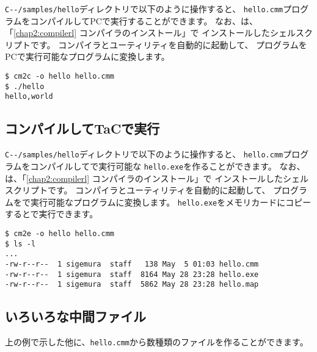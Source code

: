 \verb;C--/samples/hello;ディレクトリで以下のように操作すると、
{\tt hello.cmm}プログラムをコンパイルしてPCで実行することができます。
なお、{\cmc}は、「\ref{chap2:compilerl} コンパイラのインストール」で
インストールしたシェルスクリプトです。
コンパイラとユーティリティを自動的に起動して、
{\cmml}プログラムをPCで実行可能なプログラムに変換します。

\begin{mylist}
\begin{verbatim}
$ cm2c -o hello hello.cmm 
$ ./hello
hello,world
\end{verbatim}
\end{mylist}

\subsection{コンパイルしてTaCで実行}

\verb;C--/samples/hello;ディレクトリで以下のように操作すると、
{\tt hello.cmm}プログラムをコンパイルして{\tac}で実行可能な
{\tt hello.exe}を作ることができます。
なお、{\cme}は、「\ref{chap2:compilerl} コンパイラのインストール」で
インストールしたシェルスクリプトです。
コンパイラとユーティリティを自動的に起動して、
{\cmml}プログラムを{\tac}で実行可能なプログラムに変換します。
{\tt hello.exe}をメモリカードにコピーすると{\tac}で実行できます。

\begin{mylist}
\begin{verbatim}
$ cm2e -o hello hello.cmm 
$ ls -l
...
-rw-r--r--  1 sigemura  staff   138 May  5 01:03 hello.cmm
-rw-r--r--  1 sigemura  staff  8164 May 28 23:28 hello.exe
-rw-r--r--  1 sigemura  staff  5862 May 28 23:28 hello.map
\end{verbatim}
\end{mylist}

\subsection{いろいろな中間ファイル}

上の例で示した他に、{\tt hello.cmm}から数種類のファイルを作ることができます。

